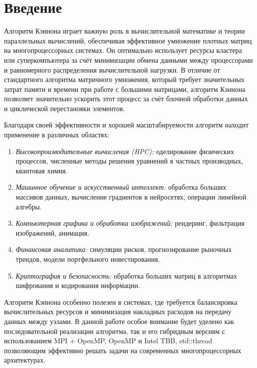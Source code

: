 \documentclass[a4paper,12pt]{article}
\begin{document}
\tableofcontents
\newpage

\section{Введение}
Алгоритм Кэннона играет важную роль в вычислительной математике и теории параллельных вычислений, обеспечивая эффективное умножение плотных матриц на многопроцессорных системах. Он оптимально использует ресурсы кластера или суперкомпьютера за счёт минимизации обмена данными между процессорами и равномерного распределения вычислительной нагрузки. В отличие от стандартного алгоритма матричного умножения, который требует значительных затрат памяти и времени при работе с большими матрицами, алгоритм Кэннона позволяет значительно ускорить этот процесс за счёт блочной обработки данных и циклической перестановки элементов.

Благодаря своей эффективности и хорошей масштабируемости алгоритм находит применение в различных областях:

\begin{enumerate}
    \item \textit{Высокопроизводительные вычисления (HPC):}
       оделирование физических процессов, численные методы решения уравнений в частных производных, квантовая химия.
    \item \textit{Машинное обучение и искусственный интеллект:}
       обработка больших массивов данных, вычисление градиентов в нейросетях, операции линейной алгебры.
    \item\textit{Компьютерная графика и обработка изображений:}
       рендеринг, фильтрация изображений, анимация.
    \item\textit{Финансовая аналитика:}
       симуляции рисков, прогнозирование рыночных трендов, модели портфельного инвестирования.
     \item\textit{Криптография и безопасность:}
       обработка больших матриц в алгоритмах шифрования и кодирования информации.
\end{enumerate}

Алгоритм Кэннона особенно полезен в системах, где требуется балансировка вычислительных ресурсов и минимизация накладных расходов на передачу данных между узлами. В данной работе особое внимание будет уделено как последовательной реализации алгоритма, так и его гибридным версиям с использованием MPI + OpenMP, OpenMP и Intel TBB, std::thread позволяющим эффективно решать задачи на современных многопроцессорных архитектурах.
\end{document}
